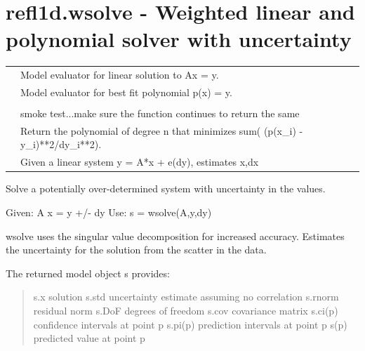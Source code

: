\documentclass[letterpaper,10pt,english]{sphinxmanual}
\begin{document}
\section{refl1d.wsolve - Weighted linear and polynomial solver with uncertainty}
\label{api/wsolve:refl1d-wsolve-weighted-linear-and-polynomial-solver-with-uncertainty}\label{api/wsolve::doc}
\begin{tabulary}{\linewidth}{LL}
\hline

{\hyperref[api/wsolve:refl1d.wsolve.LinearModel]{}}
 & 
Model evaluator for linear solution to Ax = y.
\\

{\hyperref[api/wsolve:refl1d.wsolve.PolynomialModel]{}}
 & 
Model evaluator for best fit polynomial p(x) = y.
\\

{\hyperref[api/wsolve:refl1d.wsolve.demo]{}}
 & 

\\

{\hyperref[api/wsolve:refl1d.wsolve.test]{}}
 & 
smoke test...make sure the function continues to return the same
\\

{\hyperref[api/wsolve:refl1d.wsolve.wpolyfit]{}}
 & 
Return the polynomial of degree n that minimizes sum( (p(x\_i) - y\_i)**2/dy\_i**2).
\\

{\hyperref[api/wsolve:refl1d.wsolve.wsolve]{}}
 & 
Given a linear system y = A*x + e(dy), estimates x,dx
\\
\hline
\end{tabulary}

\label{api/wsolve:module-refl1d.wsolve}
Solve a potentially over-determined system with uncertainty in
the values.

Given: A x = y +/- dy
Use:   s = wsolve(A,y,dy)

wsolve uses the singular value decomposition for increased accuracy.
Estimates the uncertainty for the solution from the scatter in the data.

The returned model object s provides:
\begin{quote}

s.x      solution
s.std    uncertainty estimate assuming no correlation
s.rnorm  residual norm
s.DoF    degrees of freedom
s.cov    covariance matrix
s.ci(p)  confidence intervals at point p
s.pi(p)  prediction intervals at point p
s(p)     predicted value at point p
\end{quote}
\end{document}

